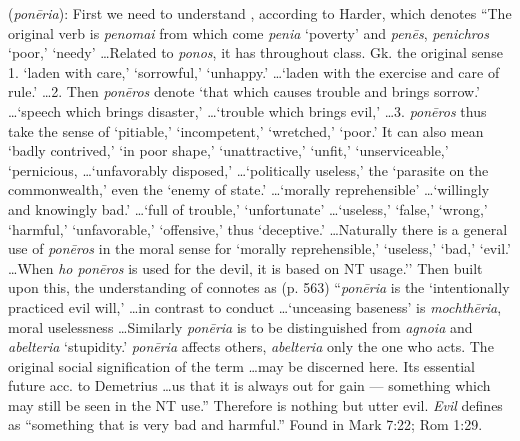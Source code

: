 \item[Evil,]

(\textit{ponēria}):
First we need to understand , according to Harder, which denotes ``The original verb is \emph{penomai} from which come \emph{penia} `poverty' and \emph{penēs}, \emph{penichros} `poor,' `needy' \ldots Related to \emph{ponos}, it has throughout class. Gk. the original sense 1. `laden with care,' `sorrowful,' `unhappy.' \ldots `laden with the exercise and care of rule.' \ldots 2. Then \emph{ponēros} denote `that which causes trouble and brings sorrow.' \ldots  `speech which brings disaster,' \ldots  `trouble which brings evil,' \ldots 3. \emph{ponēros} thus take the sense of `pitiable,' `incompetent,' `wretched,' `poor.' It can also mean `badly contrived,' `in poor shape,' `unattractive,' `unfit,' `unserviceable,' `pernicious, \ldots `unfavorably disposed,' \ldots `politically useless,' the `parasite on the commonwealth,' even the `enemy of state.' \ldots `morally reprehensible' \ldots `willingly and knowingly bad.' \ldots `full of trouble,' `unfortunate' \ldots `useless,' `false,' `wrong,' `harmful,' `unfavorable,' `offensive,' thus `deceptive.' \ldots Naturally there is a general use of \emph{ponēros} in the moral sense for `morally reprehensible,' `useless,' `bad,' `evil.' \ldots When \emph{ho ponēros} is used for the devil, it is based on NT usage.''
Then built upon this, the understanding of  connotes as (p. 563) ``\emph{ponēria} is the `intentionally practiced evil will,' \ldots in contrast to conduct \ldots `unceasing baseness' is \emph{mochthēria}, moral uselessness \ldots Similarly \emph{ponēria} is to be distinguished from \emph{agnoia} and \emph{abelteria} `stupidity.' \emph{ponēria} affects others, \emph{abelteria} only the one who acts. The original social signification of the term \ldots may be discerned here. Its essential future acc. to Demetrius \ldots us that it is always out for gain --- something which may still be seen in the NT use.''
Therefore  is nothing but utter evil. \emph{Evil} defines as ``something that is very bad and harmful.''
Found in Mark 7:22; Rom 1:29.
